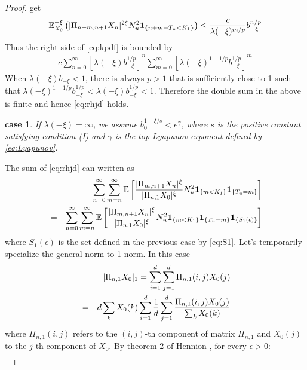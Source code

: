 \documentclass[aoas,preprint]{imsart}
\newtheorem{case}{case}
\numberwithin{equation}{section}
\theoremstyle{plain}
\begin{document}
\begin{proof}
  get
  \[
  \mathbb{E}_{X_0}^{-\xi} \left(
    | \Pi_{n+m,n+1} X_n |^{2 \xi}
    N_u^2
    \mathbf{1}_{\{n+m = T_u < K_1\}}
  \right) 
  \leq
  {
    c \over \lambda(-\xi)^{m/p}
  }
  b_{-\xi}^{n/p}
  \]
  Thus the right side of \eqref{eq:kpdf} is bounded by
  \begin{eqnarray*}
    c
    \sum_{n=0}^\infty
    \left[ \lambda(-\xi) b_{-\xi}^{1/p} \right]^{n}
    \sum_{m=0}^\infty
    \left[ \lambda(-\xi)^{1-1/p} b_{-\xi}^{1/p} \right]^{m}
  \end{eqnarray*}
  When $\lambda(-\xi) b_{-\xi} < 1$, there is always $p > 1$
  that is sufficiently close to 1 such that
  $\lambda(-\xi)^{1-1/p} b_{-\xi}^{1/p} < \lambda(-\xi)
  b_{-\xi}^{1/p} < 1$. Therefore the double sum in the above is
  finite and hence \eqref{eq:rhjd} holds.

  \begin{case}
    If $\lambda(-\xi) = \infty$, we assume
    $b_0^{1- \xi/s} < e^\gamma$, where $s$ is the positive constant
    satisfying condition (I) and $\gamma$ is the top Lyapunov exponent
    defined by \eqref{eq:Lyapunov}.
  \end{case}
  The sum of \eqref{eq:rhjd} can written as
  \begin{eqnarray*}
    &&
    \sum_{n=0}^\infty \sum_{m=n}^\infty
    \mathbb{E} \left[
      {
        |\Pi_{m, n+1} X_n |^{\xi}
        \over
        |\Pi_{n, 1} X_0 |^{\xi}        
      }
      N_u^2
      \mathbf{1}_{\{m < K_1\}}
      \mathbf{1}_{\{T_u = m\}}
    \right] \\
    &=&
    \sum_{n=0}^\infty \sum_{m=n}^\infty
    \mathbb{E} \left[
      {
        |\Pi_{m, n+1} X_n |^{\xi}
        \over
        |\Pi_{n, 1} X_0 |^{\xi}        
      }
      N_u^2
      \mathbf{1}_{\{m < K_1\}} \mathbf{1}_{\{T_u = m\}} \mathbf{1}_{\{S_1(\epsilon)\}}
    \right]
  \end{eqnarray*}
  where $S_1(\epsilon)$ is the set defined in the previous case by
  \eqref{eq:S1}. Let's temporarily specialize the general norm to
  1-norm. In this case
  \begin{eqnarray*}
    &&
    |\Pi_{n, 1} X_0|_1 = \sum_{i=1}^d \sum_{j=1}^d \Pi_{n, 1}(i, j)
    X_0(j) \\
    &=&
    d \sum_{k} X_0(k)
    \sum_{i=1}^d {1 \over d}
    \sum_{j=1}^d
    {
      \Pi_{n, 1}(i, j) X_0(j)
      \over
      \sum_{k} X_0(k)      
    }
  \end{eqnarray*}
  where $\Pi_{n, 1}(i, j)$ refers to the $(i, j)$-th component of
  matrix $\Pi_{n, 1}$ and $X_0(j)$ to the $j$-th component of $X_0$.
  By theorem 2 of Hennion \cite{hennion:1997}, for every
  $\epsilon > 0$:
  \begin{eqnarray*}

\end{eqnarray*}
\end{proof}
\end{document}
